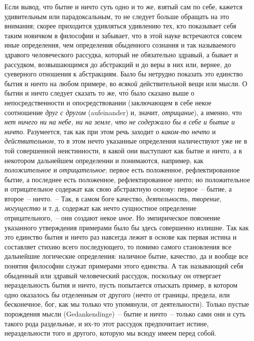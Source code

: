 Если вывод, что бытие и ничто суть одно и то же,
взятый сам по себе, кажется удивительным или парадоксальным,
то не следует больше обращать на это внимания;
скорее приходится удивляться удивлению тех, кто
показывает себя таким новичком в философии и забывает,
что в этой науке встречаются совсем иные определения,
чем определения обыденного сознания и так называемого
здравого человеческого рассудка, который не
обязательно здравый, а бывает и рассудком, возвышающимся
до абстракций и до веры в них или, вернее, до
суеверного отношения к абстракциям. Было бы нетрудно
показать это единство бытия и ничто на любом примере,
во \emph{всякой} действительной вещи или мысли. О бытии и
ничто следует сказать то же, чт\'о было сказано выше
о непосредственности и опосредствовании (заключающем
в себе некое соотношение \emph{друг с другом} (aufeinander)
и, значит, \emph{отрицание}), а именно, что \emph{нет ничего ни
на небе, ни на земле, что не содержало бы в себе и бытие
и ничто}. Разумеется, так как при этом речь заходит
о \emph{каком-то нечто} и \emph{действительном}, то в этом нечто указанные
определения наличествуют уже не в той совершенной
неистинности, в какой они выступают как бытие
и ничто, а в некотором дальнейшем определении и понимаются,
например, как \emph{положительное} и \emph{отрицательное};
первое есть положенное, рефлектированное бытие, а последнее
есть положенное, рефлектированное ничто; но
положительное и отрицательное содержат как свою абстрактную
основу: первое~-- бытие, а второе~-- ничто.~--
Так, в самом боге качество, \emph{деятельность}, \emph{творение}, \emph{могущество}
и т.\,д. содержат как нечто сущностное определение
отрицательного,~-- они создают некое \emph{иное}. Но эмпирическое
пояснение указанного утверждения примерами
было бы здесь совершенно излишне. Так как это
единство бытия и ничто раз навсегда лежит в основе как
первая истина и составляет стихию всего последующего,
то помимо самого становления все дальнейшие логические
определения: наличное бытие, качество, да и вообще
все понятия философии служат примерами этого единства.
А так называющий себя обыденный или здравый
человеческий рассудок, поскольку он отвергает нераздельность
бытия и ничто, пусть попытается отыскать
пример, в котором одно оказалось бы отделенным от
другого (нечто от границы, предела, или бесконечное,
бог, как мы только что упомянули, от деятельности).
Только пустые порождения мысли (Gedankendinge)~--
бытие и ничто~-- только сами они и суть такого рода
раздельные, и их-то этот рассудок предпочитает истине,
нераздельности того и другого, которую мы всюду имеем
перед собой.

